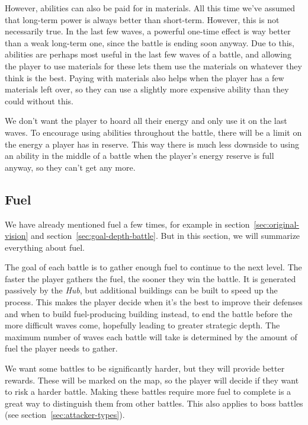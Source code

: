 However, abilities can also be paid for in materials.
All this time we've assumed that long-term power is always better than short-term.
However, this is not necessarily true.
In the last few waves, a powerful one-time effect is way better than a weak long-term one, since the battle is ending soon anyway.
Due to this, abilities are perhaps most useful in the last few waves of a battle, and allowing the player to use materials for these lets them use the materials on whatever they think is the best.
Paying with materials also helps when the player has a few materials left over, so they can use a slightly more expensive ability than they could without this.

We don't want the player to hoard all their energy and only use it on the last waves.
To encourage using abilities throughout the battle, there will be a limit on the energy a player has in reserve.
This way there is much less downside to using an ability in the middle of a battle when the player's energy reserve is full anyway, so they can't get any more.

\subsection{Fuel}\label{sec:design-fuel}

We have already mentioned fuel a few times, for example in section~\ref{sec:original-vision} and section~\ref{sec:goal-depth-battle}.
But in this section, we will summarize everything about fuel.

The goal of each battle is to gather enough fuel to continue to the next level.
The faster the player gathers the fuel, the sooner they win the battle.
It is generated passively by the \emph{Hub}, but additional buildings can be built to speed up the process.
This makes the player decide when it's the best to improve their defenses and when to build fuel-producing building instead, to end the battle before the more difficult waves come, hopefully leading to greater strategic depth.
The maximum number of waves each battle will take is determined by the amount of fuel the player needs to gather.

\begin{notindemo}
    We want some battles to be significantly harder, but they will provide better rewards.
    These will be marked on the map, so the player will decide if they want to risk a harder battle.
    Making these battles require more fuel to complete is a great way to distinguish them from other battles.
    This also applies to boss battles (see section~\ref{sec:attacker-types}).
\end{notindemo}

